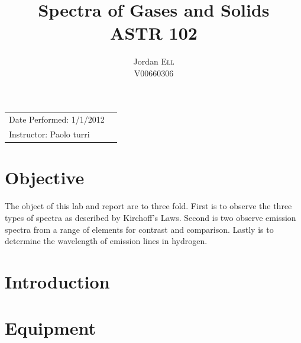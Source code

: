 \documentclass{article}
\title{Spectra of Gases and Solids \\ ASTR 102} %
\author{Jordan \textsc{Ell} \\ V00660306} %
\begin{document}
\maketitle %

\begin{tabular}{lr}
Date Performed: 1/1/2012\\ %
Instructor: Paolo turri %
\end{tabular}

\setlength\parindent{0pt} %

\renewcommand{\labelenumi}{\alph{enumi}.} %


\section{Objective}

The object of this lab and report are to three fold. First is to observe the three
types of spectra as described by Kirchoff's Laws. Second is two observe emission 
spectra from a range of elements for contrast and comparison. Lastly is to determine
the wavelength of emission lines in hydrogen.
 

\section{Introduction}




\section{Equipment}
\end{document}
